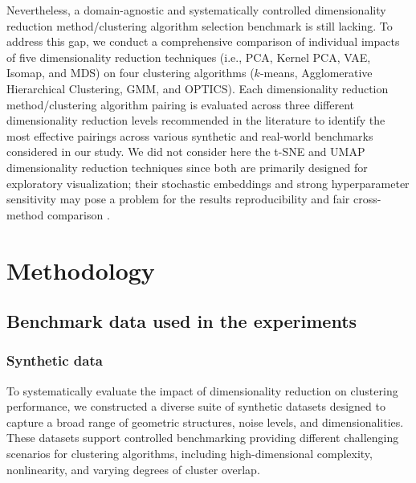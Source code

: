 \documentclass[preprint,12pt]{elsarticle}
\begin{document}
Nevertheless, a domain-agnostic and systematically controlled dimensionality reduction method/clustering algorithm selection benchmark is still lacking. To address this gap, we conduct a comprehensive comparison of individual impacts of five dimensionality reduction techniques (i.e., PCA, Kernel PCA, VAE, Isomap, and MDS) on four clustering algorithms ($k$-means, Agglomerative Hierarchical Clustering, GMM, and OPTICS). Each dimensionality reduction method/clustering algorithm pairing is evaluated across three different dimensionality reduction levels recommended in the literature to identify the most effective pairings across various synthetic and real-world benchmarks considered in our study. 
We did not consider here the t-SNE and UMAP dimensionality reduction techniques since both are primarily designed for exploratory visualization; their stochastic embeddings and strong hyperparameter sensitivity may pose a problem for the results reproducibility and fair cross-method comparison \cite{kobak2021initialization}. 

\section{Methodology} \label{sec:methodology}

\subsection{Benchmark data used in the experiments} \label{subsec:datasets}

\subsubsection{Synthetic data} \label{subsubsec:synthetic_datag}

To systematically evaluate the impact of dimensionality reduction on clustering performance, we constructed a diverse suite of synthetic datasets designed to capture a broad range of geometric structures, noise levels, and dimensionalities. These datasets support controlled benchmarking providing different challenging scenarios for clustering algorithms, including high-dimensional complexity, nonlinearity, and varying degrees of cluster overlap. 
\end{document}
